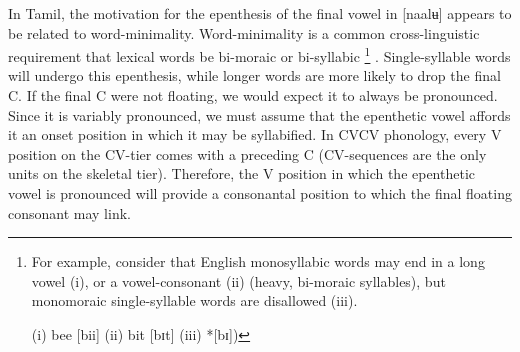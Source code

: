 \documentclass[output=paper,colorlinks,citecolor=brown,
]{langscibook}
\begin{document}
In Tamil, the motivation for the epenthesis of the final vowel in [naalʉ] appears to be related to word-minimality. Word-minimality is a common cross-linguistic requirement that lexical words be bi-moraic or bi-syllabic \footnote{  For example, consider that English monosyllabic words may end in a long vowel (i), or a vowel-consonant (ii) (heavy, bi-moraic syllables), but monomoraic single-syllable words are disallowed (iii). 

(i)	bee [bii]	\hspace{1cm}	(ii) 	bit [bɪt]	\hspace{1cm}	(iii)	*[bɪ])

} .  Single-syllable words will undergo this epenthesis, while longer words are more likely to drop the final C. If the final C were not floating, we would expect it to always be pronounced. Since it is variably pronounced, we must assume that the epenthetic vowel affords it an onset position in which it may be syllabified. In CVCV phonology, every V position on the CV-tier comes with a preceding C (CV-sequences are the only units on the skeletal tier). Therefore, the V position in which the epenthetic vowel is pronounced will provide a consonantal position to which the final floating consonant may link. 
\end{document}
